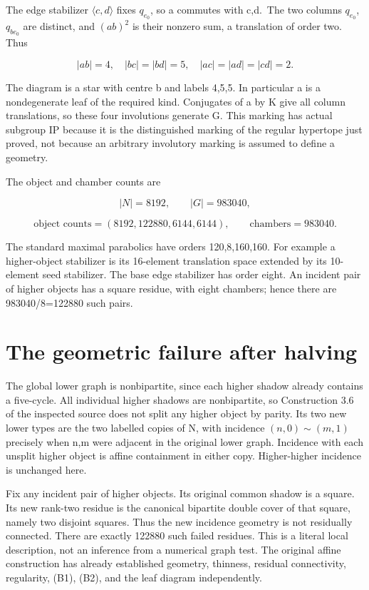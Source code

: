 The edge stabilizer \(\langle c,d\rangle\) fixes \(q_{e_0}\), so a
commutes with c,d.~The two columns \(q_{e_0}\),\(q_{be_0}\) are
distinct, and \((ab)^2\) is their nonzero sum, a translation of order
two. Thus

\[|ab|=4,\quad |bc|=|bd|=5,\quad |ac|=|ad|=|cd|=2.\]

The diagram is a star with centre b and labels 4,5,5. In particular a is
a nondegenerate leaf of the required kind. Conjugates of a by K give all
column translations, so these four involutions generate G. This marking
has actual subgroup IP because it is the distinguished marking of the
regular hypertope just proved, not because an arbitrary involutory
marking is assumed to define a geometry.

The object and chamber counts are

\[|N|=8192,\qquad |G|=983040,\]

\[\text{object counts}=(8192,122880,6144,6144),\qquad\text{chambers}=983040.\]

The standard maximal parabolics have orders 120,8,160,160. For example a
higher-object stabilizer is its 16-element translation space extended by
its 10-element seed stabilizer. The base edge stabilizer has order
eight. An incident pair of higher objects has a square residue, with
eight chambers; hence there are 983040/8=122880 such pairs.

\section{The geometric failure after
halving}\label{the-geometric-failure-after-halving}

The global lower graph is nonbipartite, since each higher shadow already
contains a five-cycle. All individual higher shadows are nonbipartite,
so Construction 3.6 of the inspected source does not split any higher
object by parity. Its two new lower types are the two labelled copies of
N, with incidence \((n,0)\sim(m,1)\) precisely when n,m were adjacent in the
original lower graph. Incidence with each unsplit higher object is
affine containment in either copy. Higher-higher incidence is unchanged
here.

Fix any incident pair of higher objects. Its original common shadow is a
square. Its new rank-two residue is the canonical bipartite double cover
of that square, namely two disjoint squares. Thus the new incidence
geometry is not residually connected. There are exactly 122880 such
failed residues. This is a literal local description, not an inference
from a numerical graph test. The original affine construction has
already established geometry, thinness, residual connectivity,
regularity, (B1), (B2), and the leaf diagram independently.

